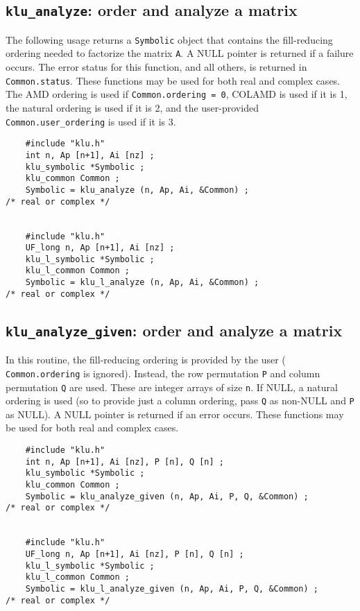 \documentclass[11pt]{article}
\begin{document}
\subsection{{\tt klu\_analyze}: order and analyze a matrix}

The following usage returns a {\tt Symbolic} object that contains the
fill-reducing ordering needed to factorize the matrix {\tt A}.  A NULL pointer
is returned if a failure occurs.  The error status for this function, and all
others, is returned in {\tt Common.status}.  These functions may be used for
both real and complex cases.  The AMD ordering is used if {\tt Common.ordering
= 0}, COLAMD is used if it is 1, the natural ordering is used if it is 2, and
the user-provided {\tt Common.user\_ordering} is used if it is 3.

{\footnotesize
\begin{verbatim}
    #include "klu.h"
    int n, Ap [n+1], Ai [nz] ;
    klu_symbolic *Symbolic ;
    klu_common Common ;
    Symbolic = klu_analyze (n, Ap, Ai, &Common) ;                             /* real or complex */


    #include "klu.h"
    UF_long n, Ap [n+1], Ai [nz] ;
    klu_l_symbolic *Symbolic ;
    klu_l_common Common ;
    Symbolic = klu_l_analyze (n, Ap, Ai, &Common) ;                           /* real or complex */
\end{verbatim}
}

\subsection{{\tt klu\_analyze\_given}: order and analyze a matrix}

In this routine, the fill-reducing ordering is provided by the user ({\tt
Common.ordering} is ignored).  Instead, the row permutation {\tt P} and column
permutation {\tt Q} are used.  These are integer arrays of size {\tt n}.  If
NULL, a natural ordering is used (so to provide just a column ordering, pass
{\tt Q} as non-NULL and {\tt P} as NULL).  A NULL pointer is returned if an
error occurs.  These functions may be used for both real and complex cases.

{\footnotesize
\begin{verbatim}
    #include "klu.h"
    int n, Ap [n+1], Ai [nz], P [n], Q [n] ;
    klu_symbolic *Symbolic ;
    klu_common Common ;
    Symbolic = klu_analyze_given (n, Ap, Ai, P, Q, &Common) ;                 /* real or complex */


    #include "klu.h"
    UF_long n, Ap [n+1], Ai [nz], P [n], Q [n] ;
    klu_l_symbolic *Symbolic ;
    klu_l_common Common ;
    Symbolic = klu_l_analyze_given (n, Ap, Ai, P, Q, &Common) ;               /* real or complex */
\end{verbatim}
}
\end{document}
